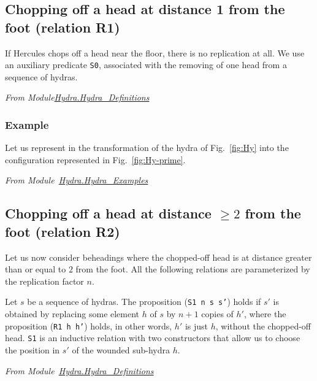 \subsection{Chopping off a head at distance 1 from the foot (relation  R1)}

If Hercules chops off a head near the floor, there is no replication at all. We use an auxiliary 
predicate \texttt{S0}, associated with the removing of one head from a sequence of hydras.


\vspace{4pt}\emph{From Module\href{../theories/html/hydras.Hydra.Hydra_Definitions.html}{Hydra.Hydra\_Definitions}}




\subsubsection{Example}
\label{sec:orgheadline45}

Let us represent in \coq{}   the transformation of the hydra of Fig.~\vref{fig:Hy} into
the configuration represented in Fig.~\ref{fig:Hy-prime}.

\vspace{4pt}
\emph{From Module~\href{../theories/html/hydras.Hydra.Hydra_Examples.html}{Hydra.Hydra\_Examples}}





\subsection{Chopping off a head at distance \texorpdfstring{$\geq 2$}{>= 2} from the foot (relation R2) }


Let us now consider beheadings  where the chopped-off head is at distance greater than or equal to $2$ from the foot. All the following relations are parameterized by the replication factor  $n$.

 Let $s$ be a sequence of hydras. 
The proposition (\texttt{S1 n s s'}) holds if $s'$ is obtained by replacing some element $h$ of $s$ by 
$n+1$ copies of $h'$, where  the proposition (\texttt{R1 h h'}) holds, in other words, $h'$ is just $h$, without the chopped-off  head. \texttt{S1} is an inductive relation with two constructors that allow us to choose the position in $s'$ of the wounded sub-hydra $h$.

\vspace{4pt}
\noindent
\emph{From Module~\href{../theories/html/hydras.Hydra.Hydra_Definitions.html\#S1}{Hydra.Hydra\_Definitions}}

